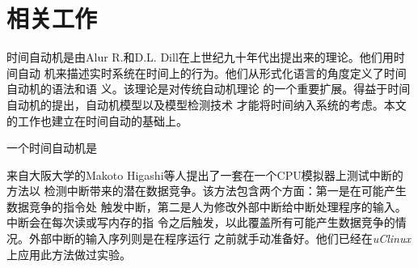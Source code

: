 
\chapter{相关工作}
\label{cha:related_work}


时间自动机是由Alur R.和D.L. Dill在上世纪九十年代出提出来的理论。他们用时间自动
机来描述实时系统在时间上的行为。他们从形式化语言的角度定义了时间自动机的语法和语
义\cite{Alur:1994:TTA:180782.180519}。该理论是对传统自动机理论\cite{Hopcroft:2006:IAT:1196416}
的一个重要扩展。得益于时间自动机的提出，自动机模型以及模型检测技术\cite{Clarke:2000:MC:332656}
才能将时间纳入系统的考虑。本文的工作也建立在时间自动的基础上。

\begin{definition}
	一个时间自动机是
\end{definition}

来自大阪大学的Makoto Higashi等人提出了一套在一个CPU模拟器上测试中断的方法以
检测中断带来的潜在数据竞争。该方法包含两个方面：第一是在可能产生数据竞争的指令处
触发中断，第二是人为修改外部中断给中断处理程序的输入。中断会在每次读或写内存的指
令之后触发，以此覆盖所有可能产生数据竞争的情况。外部中断的输入序列则是在程序运行
之前就手动准备好。他们已经在\emph{uClinux}上应用此方法做过实验。\cite{Higashi:2010:EMC:1808266.1808278}

